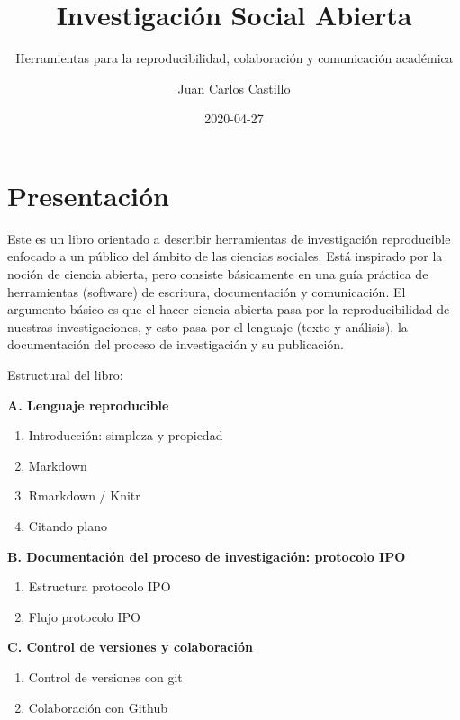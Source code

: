 \documentclass[
  11pt,
]{book}
\title{Investigación Social Abierta}
\subtitle{Herramientas para la reproducibilidad, colaboración y comunicación académica}
\author{Juan Carlos Castillo}
\date{2020-04-27}
\providecommand{\tightlist}{%
  \setlength{\itemsep}{0pt}\setlength{\parskip}{0pt}}
\begin{document}
\maketitle

{
\setcounter{tocdepth}{1}
\tableofcontents
}
\hypertarget{presentaciuxf3n}{%
\chapter*{Presentación}\label{presentaciuxf3n}}

Este es un libro orientado a describir herramientas de investigación reproducible enfocado a un público del ámbito de las ciencias sociales. Está inspirado por la noción de ciencia abierta, pero consiste básicamente en una guía práctica de herramientas (software) de escritura, documentación y comunicación. El argumento básico es que el hacer ciencia abierta pasa por la reproducibilidad de nuestras investigaciones, y esto pasa por el lenguaje (texto y análisis), la documentación del proceso de investigación y su publicación.

Estructural del libro:

\textbf{A. Lenguaje reproducible}

\begin{enumerate}
\def\labelenumi{\arabic{enumi}.}
\tightlist
\item
  Introducción: simpleza y propiedad
\item
  Markdown
\item
  Rmarkdown / Knitr
\item
  Citando plano
\end{enumerate}

\textbf{B. Documentación del proceso de investigación: protocolo IPO}

\begin{enumerate}
\def\labelenumi{\arabic{enumi}.}
\setcounter{enumi}{4}
\tightlist
\item
  Estructura protocolo IPO
\item
  Flujo protocolo IPO
\end{enumerate}

\textbf{C. Control de versiones y colaboración}

\begin{enumerate}
\def\labelenumi{\arabic{enumi}.}
\setcounter{enumi}{6}
\tightlist
\item
  Control de versiones con git
\item
  Colaboración con Github
\end{enumerate}
\end{document}
